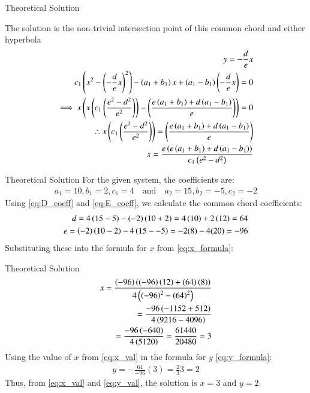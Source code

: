 \documentclass{beamer}
\begin{document}
		\begin{frame}{Theoretical Solution}
		
	The solution is the non-trivial intersection point of this common chord and either hyperbola
	\begin{align}
		y = -\frac{d}{e}x \label{eq:y_formula} \\
		c_1\left(x^2 - \left(-\frac{d}{e}x\right)^2\right) - \left(a_1+b_1\right)x + \left(a_1-b_1\right)\left(-\frac{d}{e}x\right) = 0 \\
		\implies x \left( x\left(c_1\left(\frac{e^2-d^2}{e^2}\right)\right) - \left(\frac{e\left(a_1+b_1\right) + d\left(a_1-b_1\right)}{e}\right) \right) = 0 \\
		\therefore x\left(c_1\left(\frac{e^2-d^2}{e^2}\right)\right) = \left(\frac{e\left(a_1+b_1\right)+d\left(a_1-b_1\right)}{e}\right) \\
		x = \frac{e\left(e\left(a_1+b_1\right)+d\left(a_1-b_1\right)\right)}{c_1\left(e^2-d^2\right)} \label{eq:x_formula}
	\end{align}
	\end{frame}
		\begin{frame}{Theoretical Solution}
			For the given system, the coefficients are:
		\begin{align}
			a_1 = 10, b_1 = 2, c_1 = 4 \quad \text{and} \quad a_2 = 15, b_2 = -5, c_2 = -2
		\end{align}
		Using \eqref{eq:D_coeff} and \eqref{eq:E_coeff}, we calculate the common chord coefficients:
		\begin{align}
			d = 4\left(15-5\right) - \left(-2\right)\left(10+2\right) = 4\left(10\right) + 2\left(12\right) = 64 \\
			e = \left(-2\right)\left(10-2\right) - 4\left(15--5\right) = -2(8) - 4(20) = -96
		\end{align}
		Substituting these into the formula for $x$ from \eqref{eq:x_formula}:
		
	\end{frame}	
	\begin{frame}{Theoretical Solution}
	\begin{align}
		x = \frac{\left(-96\right) \left(\left(-96\right)\left(12\right) + \left(64\right)\left(8\right)\right)}{4\left(\left(-96\right)^2-\left(64\right)^2\right)} \\
		= \frac{-96  \left(-1152 + 512\right)}{4\left(9216 - 4096\right)} \\
		= \frac{-96\left(-640\right)}{4\left(5120\right)} = \frac{61440}{20480} = 3 \label{eq:x_val}
	\end{align}
	Using the value of $x$ from \eqref{eq:x_val} in the formula for $y$ \eqref{eq:y_formula}:
	\begin{align}
		y = -\frac{64}{-96}(3) = \frac{2}{3}3 = 2 \label{eq:y_val}
	\end{align}
	Thus, from \eqref{eq:x_val} and \eqref{eq:y_val}, the solution is $x=3$ and $y=2$.
	
	\end{frame}
	
\end{document}
